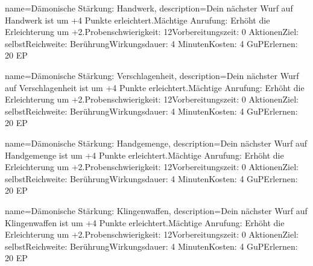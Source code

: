 {
    name={Dämonische Stärkung: Handwerk},
    description={Dein nächster Wurf auf Handwerk ist um +4 Punkte erleichtert.\newline Mächtige Anrufung: Erhöht die Erleichterung um +2.\newline Probenschwierigkeit: 12\newline Vorbereitungszeit: 0 Aktionen\newline Ziel: selbst\newline Reichweite: Berührung\newline Wirkungsdauer: 4 Minuten\newline Kosten: 4 GuP\newline Erlernen: 20 EP}
}


{
    name={Dämonische Stärkung: Verschlagenheit},
    description={Dein nächster Wurf auf Verschlagenheit ist um +4 Punkte erleichtert.\newline Mächtige Anrufung: Erhöht die Erleichterung um +2.\newline Probenschwierigkeit: 12\newline Vorbereitungszeit: 0 Aktionen\newline Ziel: selbst\newline Reichweite: Berührung\newline Wirkungsdauer: 4 Minuten\newline Kosten: 4 GuP\newline Erlernen: 20 EP}
}


{
    name={Dämonische Stärkung: Handgemenge},
    description={Dein nächster Wurf auf Handgemenge ist um +4 Punkte erleichtert.\newline Mächtige Anrufung: Erhöht die Erleichterung um +2.\newline Probenschwierigkeit: 12\newline Vorbereitungszeit: 0 Aktionen\newline Ziel: selbst\newline Reichweite: Berührung\newline Wirkungsdauer: 4 Minuten\newline Kosten: 4 GuP\newline Erlernen: 20 EP}
}


{
    name={Dämonische Stärkung: Klingenwaffen},
    description={Dein nächster Wurf auf Klingenwaffen ist um +4 Punkte erleichtert.\newline Mächtige Anrufung: Erhöht die Erleichterung um +2.\newline Probenschwierigkeit: 12\newline Vorbereitungszeit: 0 Aktionen\newline Ziel: selbst\newline Reichweite: Berührung\newline Wirkungsdauer: 4 Minuten\newline Kosten: 4 GuP\newline Erlernen: 20 EP}
}


